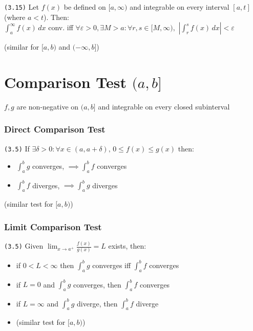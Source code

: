 \documentclass[a4paper,landscape]{article}
\newcommand{\tnum}[1]{{\color{gray}\footnotesize\texttt{(#1)}}}
\begin{document}
\begin{multicols}{2}
\tnum{3.15} Let $f(x)$ be defined on $[a,\infty)$ and integrable on every interval $[a,t]$ (where $a<t$). Then: \\
 $\displaystyle\int ^\infty_{a}f(x) \, dx$ conv. iff $\forall\varepsilon>0,\exists M>a:\forall r,s\in[M,\infty),\,\,\displaystyle\left|\int ^s_{r}f(x) \, dx\right|<\varepsilon$

{\small(similar for $[a,b)$ and $(-\infty,b]$)}

\columnbreak

\section{Comparison Test $(a,b]$}
$f,g$ are non-negative on $(a,b]$ and integrable on every closed subinterval

\subsubsection{Direct Comparison Test}

\tnum{3.5} If $\exists \delta>0:\forall x\in(a,a+\delta),\,0\leq f(x)\leq g(x)$ then:

\begin{itemize}
    \item $\int ^b_{a} g$ converges, $\implies\int ^b_{a} f$ converges
    \item $\int ^b_{a} f$ diverges, $\implies\int ^b_{a} g$ diverges
\end{itemize}

{\small(similar test for $[a,b)$)}

\subsubsection{Limit Comparison Test}

\tnum{3.5\*} Given $\displaystyle\lim_{ x \to a^+ }\frac{f(x)}{g(x)}=L$ exists, then:

\begin{itemize}
    \item if $0<L<\infty$ then $\displaystyle\int ^b_{a}g$ converges iff $\displaystyle\int ^b_{a}f$ converges
    \item if $L=0$ and $\displaystyle\int ^b_{a}g$ converges, then $\displaystyle\int ^b_{a}f$ converges
    \item if $L=\infty$ and $\displaystyle\int ^b_{a}g$ diverge, then $\displaystyle\int ^b_{a}f$ diverge
    \item (similar test for $[a,b)$)
\end{itemize}



\end{multicols}
\end{document}

